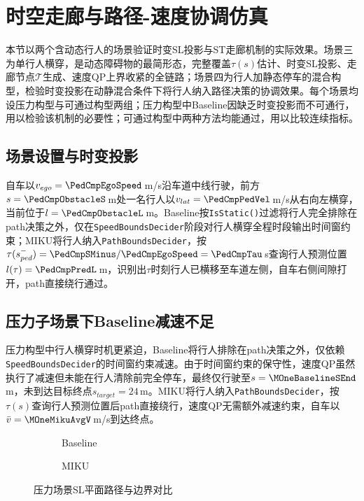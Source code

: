 \section{时空走廊与路径-速度协调仿真}
\label{sec:exp_ch7}

本节以两个含动态行人的场景验证时变SL投影与ST走廊机制的实际效果。场景三为单行人横穿，是动态障碍物的最简形态，完整覆盖$\tau(s)$估计、时变SL投影、走廊节点$\mathcal{T}$生成、速度QP上界收紧的全链路；场景四为行人加静态停车的混合构型，检验时变投影在动静混合条件下将行人纳入路径决策的协调效果。每个场景均设压力构型与可通过构型两组；压力构型中Baseline因缺乏时变投影而不可通行，用以检验该机制的必要性；可通过构型中两种方法均能通过，用以比较连续指标。

\subsection{场景设置与时变投影}

自车以$v_{ego}=\PedCmpEgoSpeed$\,m/s沿车道中线行驶，前方$s=\PedCmpObstacleS$\,m处一名行人以$v_{lat}=\PedCmpPedVel$\,m/s从右向左横穿，当前位于$l=\PedCmpObstacleL$\,m。Baseline按\texttt{IsStatic()}过滤将行人完全排除在path决策之外，仅在\texttt{SpeedBoundsDecider}阶段对行人横穿全程时段输出时间窗约束；MIKU将行人纳入\texttt{PathBoundsDecider}，按$\tau(s_{ped}^{-})=\PedCmpSMinus/\PedCmpEgoSpeed=\PedCmpTau$\,s查询行人预测位置$l(\tau)=\PedCmpPredL$\,m，识别出$\tau$时刻行人已横移至车道左侧，自车右侧间隙打开，path直接绕行通过。

\subsection{压力子场景下Baseline减速不足}

压力构型中行人横穿时机更紧迫，Baseline将行人排除在path决策之外，仅依赖\texttt{SpeedBoundsDecider}的时间窗约束减速。由于时间窗约束的保守性，速度QP虽然执行了减速但未能在行人清除前完全停车，最终仅行驶至$s=\MOneBaselineSEnd$\,m，未到达目标终点$s_{target}=24$\,m。MIKU将行人纳入\texttt{PathBoundsDecider}，按$\tau(s)$查询行人预测位置后path直接绕行，速度QP无需额外减速约束，自车以$\bar{v}=\MOneMikuAvgV$\,m/s到达终点。

\begin{figure}[H]
\centering
\begin{subfigure}[b]{\textwidth}
  \centering
  
  \caption{Baseline}
  \label{fig:exp_ch7_pressure_sl:a}
\end{subfigure}

\begin{subfigure}[b]{\textwidth}
  \centering
  
  \caption{MIKU}
  \label{fig:exp_ch7_pressure_sl:b}
\end{subfigure}
\caption{压力场景SL平面路径与边界对比}
\label{fig:exp_ch7_pressure_sl}
\end{figure}

